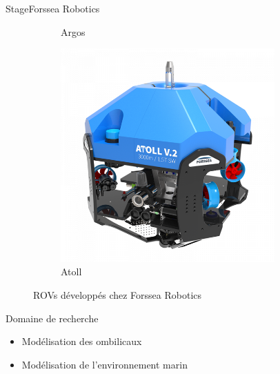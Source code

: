 \begin{frame}{Stage}{Forssea Robotics}
\begin{minipage}{0.45\textwidth}
\begin{figure}
\begin{subfigure}[b]{0.48\textwidth}
                \caption{Argos}
            \end{subfigure}
            \hfill
            \begin{subfigure}[b]{0.48\textwidth}
                \centering
                \includegraphics[width=0.9\textwidth]{images/internship_forssea/atoll.png}
                \caption{Atoll}
            \end{subfigure}
            \caption{ROVs développés chez Forssea Robotics}
        \end{figure}
        \begin{block}{Domaine de recherche}
            \begin{itemize}
                \item Modélisation des ombilicaux \\
                \item Modélisation de l'environnement marin
            \end{itemize}
        \end{block}
    \end{minipage}
\end{frame}